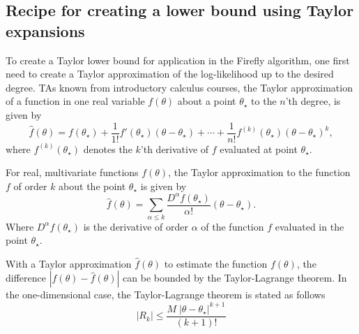 \subsection{Recipe for creating a lower bound using Taylor expansions} \label{subsec:taylor_bound_intro}
To create a Taylor lower bound for application in the Firefly algorithm, one first need to create a Taylor approximation of the log-likelihood up to the desired degree. TAs known from introductory calculus courses, the Taylor approximation of a function in one real variable $f\left(\theta\right)$ about a point $\theta_{\star}$ to the $n$'th degree, is given by 
\begin{equation}\label{eq:taylor} 
\hat{f}\left(\theta\right) = f\left(\theta_{\star}\right) + \frac{1}{1!} f'\left(\theta_{\star}\right) \left(\theta - \theta_{\star}\right) + \cdots + \frac{1}{n!} f^{\left(k\right)} \left(\theta_{\star}\right) \left(\theta-\theta_{\star}\right)^k,  
\end{equation} where $f^{\left(k\right)}\left(\theta_{\star}\right)$ denotes the $k$'th derivative of $f$ evaluated at point $\theta_{\star}$. 

For real, multivariate functions $f\left(\theta\right)$, the Taylor approximation to the function $f$ of order $k$ about the point $\theta_{\star}$ is given by 
\begin{equation}
\hat{f}\left(\theta\right) = \sum_{\alpha \leq k} \frac{D^{\alpha}f\left(\theta_{\star}\right)}{\alpha!}\left(\theta - \theta_{\star}\right).   
\end{equation}
Where $D^{\alpha} f\left(\theta_{\star}\right)$ is the derivative of order $\alpha$ of the function $f$ evaluated in the point $\theta_{\star}$.  

With a Taylor approximation $\hat{f}\left(\theta\right)$ to estimate the function $f\left(\theta\right)$, the difference $\left|f\left(\theta\right) - \hat{f}\left(\theta\right)\right|$ can be bounded by the Taylor-Lagrange theorem. In the one-dimensional case, the Taylor-Lagrange theorem is stated as follows
\begin{equation}\label{eq:taylor_lagr}
|R_k| \leq \frac{M\;|\theta-\theta_{\star}|^{k+1}}{\left(k+1\right)!}
\end{equation}

